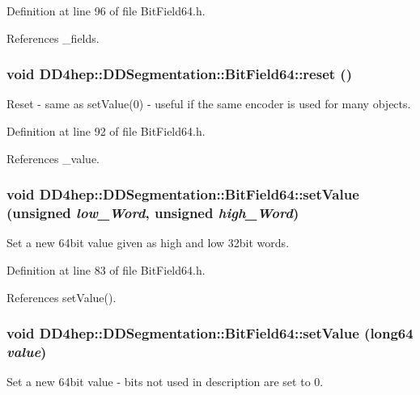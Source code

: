 Definition at line 96 of file BitField64.h.

References \_\-fields.\hypertarget{class_d_d4hep_1_1_d_d_segmentation_1_1_bit_field64_af9f7362c6d23d8cce8669f8611def7e5}{
\subsubsection[{reset}]{\setlength{\rightskip}{0pt plus 5cm}void DD4hep::DDSegmentation::BitField64::reset ()}}
\label{class_d_d4hep_1_1_d_d_segmentation_1_1_bit_field64_af9f7362c6d23d8cce8669f8611def7e5}
Reset -\/ same as setValue(0) -\/ useful if the same encoder is used for many objects. 

Definition at line 92 of file BitField64.h.

References \_\-value.\hypertarget{class_d_d4hep_1_1_d_d_segmentation_1_1_bit_field64_a0419ced4361da328259e8c71bdd28671}{
\subsubsection[{setValue}]{\setlength{\rightskip}{0pt plus 5cm}void DD4hep::DDSegmentation::BitField64::setValue (unsigned {\em low\_\-Word}, \/  unsigned {\em high\_\-Word})}}
\label{class_d_d4hep_1_1_d_d_segmentation_1_1_bit_field64_a0419ced4361da328259e8c71bdd28671}
Set a new 64bit value given as high and low 32bit words. 

Definition at line 83 of file BitField64.h.

References setValue().\hypertarget{class_d_d4hep_1_1_d_d_segmentation_1_1_bit_field64_a525ef87b1f0e9ff00a072102ac2f9457}{
\subsubsection[{setValue}]{\setlength{\rightskip}{0pt plus 5cm}void DD4hep::DDSegmentation::BitField64::setValue ({\bf long64} {\em value})}}
\label{class_d_d4hep_1_1_d_d_segmentation_1_1_bit_field64_a525ef87b1f0e9ff00a072102ac2f9457}
Set a new 64bit value -\/ bits not used in description are set to 0. 

